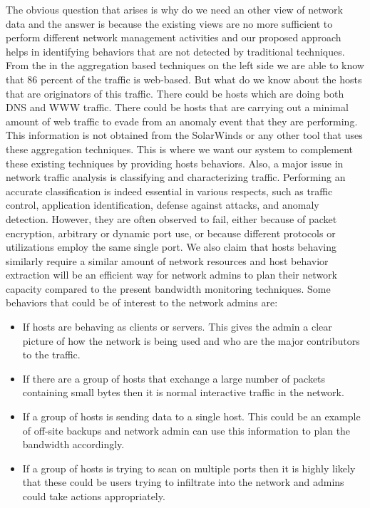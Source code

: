 The obvious question that arises is why do we need an other view of network data and the answer is because the existing views are no more sufficient to perform different network management activities and our proposed approach helps in identifying behaviors that are not detected by traditional techniques. From the  in the aggregation based techniques on the left side we are able to know that 86 percent of the traffic is web-based. But what do we know about the hosts that are originators of this traffic. There could be hosts which are doing both DNS and WWW traffic. There could be hosts that are carrying out a minimal amount of web traffic to evade from an anomaly event that they are performing. This information is not obtained from the SolarWinds or any other tool that uses these aggregation techniques. This is where we want our system to complement these existing techniques by providing hosts behaviors. Also, a major issue in network traffic analysis is classifying and characterizing traffic. Performing an accurate classification is indeed essential in various respects, such as traffic control, application identification, defense against attacks, and anomaly detection.
However, they are often observed to fail, either because of packet encryption, arbitrary or dynamic port use, or because different protocols or utilizations employ the same single port.
We also claim that hosts behaving similarly require a similar amount of network resources and host behavior extraction will be an efficient way for network admins to plan their network capacity compared to the present bandwidth monitoring techniques. Some behaviors that could be of interest to the network admins are:


\begin{itemize}
	\item If hosts are behaving as clients or servers. This gives the admin a clear picture of how the network is being used and who are the major contributors to the traffic.
	\item If there are a group of hosts that exchange a large number of packets containing small bytes then it is normal interactive traffic in the network.	
	\item If a group of hosts is sending data to a single host. This could be an example of off-site backups and network admin can use this information to plan the bandwidth accordingly.
	\item If a group of hosts is trying to scan on multiple ports then it is highly likely that these could be users trying to infiltrate into the network and admins could take actions appropriately.
	
\end{itemize}


